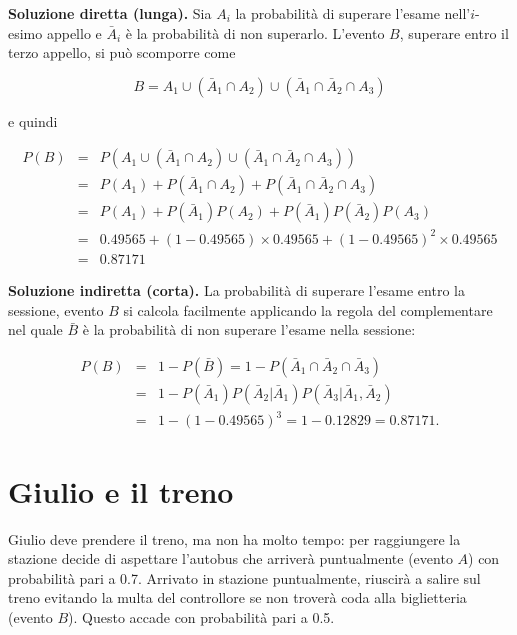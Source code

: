 \documentclass[
  11pt,
]{book}
\theoremstyle{mytheoremstyle}
\theoremstyle{mydefstyle}
\newenvironment{sol}
  {
  \begin{tcolorbox}[enhanced,breakable,arc=0.1mm,boxrule=1pt,colback=white,colframe=iblue,
  title=\bf \fontfamily{lmss}\selectfont \hspace{.5 cm} Soluzione,drop fuzzy shadow]

}{
\end{tcolorbox}
  }
\begin{document}
\begin{sol}
\textbf{Soluzione diretta (lunga).}
Sia \(A_{i}\) la probabilità di superare l'esame nell'\(i\)-esimo
appello e \(\bar{A}_{i}\) è la probabilità di non superarlo.
L'evento \(B\), superare entro il terzo appello, si può scomporre come

\[B=A_1\cup(\bar A_1\cap A_2)\cup(\bar A_1\cap\bar A_2\cap A_3)\]

e quindi

\begin{eqnarray*}
  P(B) &=& P(A_1\cup(\bar A_1\cap A_2)\cup(\bar A_1\cap\bar A_2\cap A_3))\\
       &=& P(A_1)+P(\bar A_1\cap A_2)+P(\bar A_1\cap\bar A_2\cap A_3)\\
       &=& P(A_1)+P(\bar A_1)P( A_2)+P(\bar A_1)P(\bar A_2)P( A_3)\\ 
       &=& 0.49565+(1-0.49565)\times 0.49565 + (1-0.49565)^2\times 0.49565\\
       &=& 0.87171
\end{eqnarray*}

\textbf{Soluzione indiretta (corta).}
La probabilità di superare l'esame entro la sessione, evento \(B\)
si calcola facilmente applicando la regola del complementare nel
quale \(\bar{B}\) è la probabilità di non superare l'esame nella
sessione:

\begin{eqnarray*}
P(B) &=& 1- P(\bar{B})
      =  1- P(\bar{A}_{1} \cap \bar{A}_{2} \cap \bar{A}_{3}) \\
     &=& 1- P(\bar{A}_{1}) P(\bar{A}_{2}  |  \bar{A}_{1}) 
            P(\bar{A}_{3}  |  \bar{A}_{1}, \bar{A}_{2}) \\
     &=& 1- \left( 1-0.49565 \right)^{3} = 1 - 0.12829= 0.87171  .
\end{eqnarray*}

\end{sol}

\section{Giulio e il treno}\label{giulio-e-il-treno}

Giulio deve prendere il treno, ma non ha molto tempo: per
raggiungere la stazione decide di aspettare l'autobus che
arriverà puntualmente (evento \(A\)) con probabilità pari a 0.7.
Arrivato in stazione puntualmente, riuscirà a salire sul
treno evitando la multa del controllore se non troverà
coda alla biglietteria (evento \(B\)).
Questo accade con probabilità pari a 0.5.
\end{document}
